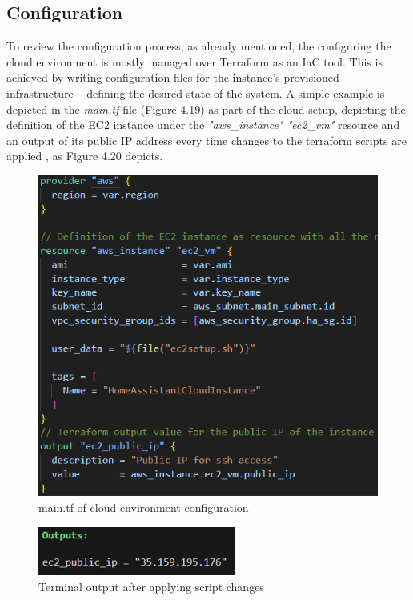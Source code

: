 \subsection{Configuration}
To review the configuration process, as already mentioned, the configuring the cloud environment is mostly managed over Terraform as an IaC tool. This is achieved by writing configuration files for the instance's provisioned infrastructure -- defining the desired state of the system. A simple example is depicted in the \textit{main.tf} file (Figure 4.19) as part of the cloud setup, depicting the definition of the EC2 instance under the \textit{"aws\_instance" "ec2\_vm"} resource and an output of its public IP address every time changes to the terraform scripts are applied \cite{tf_output}, as Figure 4.20 depicts.
\begin{figure}[H]
	\centering
	\includegraphics[width=0.7 \linewidth]{Images/K4/Picture29.png}
	\caption{main.tf of cloud environment configuration}
	\label{fig:main_tf}
\end{figure}
\begin{figure}[H]
	\centering
	\includegraphics[width=0.4 \linewidth]{Images/K4/Picture30.png}
	\caption{Terminal output after applying script changes}
	\label{fig:main_tf_output}
\end{figure}

